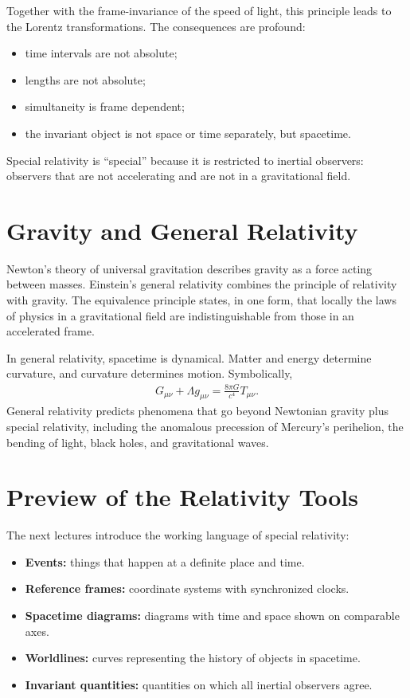 \documentclass[12pt]{article}
\newcommand{\be}{\begin{eqnarray}}
\newcommand{\ee}{\end{eqnarray}}
\begin{document}
Together with the frame-invariance of the speed of light, this principle leads to the Lorentz transformations. The consequences are profound:
\begin{itemize}
    \item time intervals are not absolute;
    \item lengths are not absolute;
    \item simultaneity is frame dependent;
    \item the invariant object is not space or time separately, but spacetime.
\end{itemize}

Special relativity is ``special'' because it is restricted to inertial observers: observers that are not accelerating and are not in a gravitational field.

\section{Gravity and General Relativity}
Newton's theory of universal gravitation describes gravity as a force acting between masses. Einstein's general relativity combines the principle of relativity with gravity. The equivalence principle states, in one form, that locally the laws of physics in a gravitational field are indistinguishable from those in an accelerated frame.

In general relativity, spacetime is dynamical. Matter and energy determine curvature, and curvature determines motion. Symbolically,
\be
G_{\mu\nu} + \Lambda g_{\mu\nu} = \frac{8\pi G}{c^4} T_{\mu\nu}.
\ee
General relativity predicts phenomena that go beyond Newtonian gravity plus special relativity, including the anomalous precession of Mercury's perihelion, the bending of light, black holes, and gravitational waves.

\section{Preview of the Relativity Tools}
The next lectures introduce the working language of special relativity:
\begin{itemize}
    \item \textbf{Events:} things that happen at a definite place and time.
    \item \textbf{Reference frames:} coordinate systems with synchronized clocks.
    \item \textbf{Spacetime diagrams:} diagrams with time and space shown on comparable axes.
    \item \textbf{Worldlines:} curves representing the history of objects in spacetime.
    \item \textbf{Invariant quantities:} quantities on which all inertial observers agree.
\end{itemize}
\end{document}
